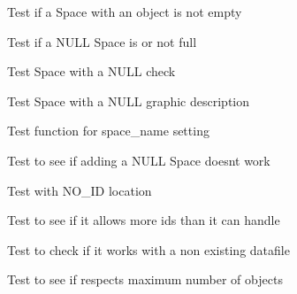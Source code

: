 \begin{DoxyRefList}
\item[\label{test__test000249}%
\hypertarget{test__test000249}{}%
Member \hyperlink{space__test_8h_aab8036bf4d58b361f8ac494ab94f6480}{test3\+\_\+space\+\_\+is\+\_\+empty} ()]Test if a Space with an object is not empty  
\item[\label{test__test000252}%
\hypertarget{test__test000252}{}%
Member \hyperlink{space__test_8h_a006533758c4f6d2d9cec39d52e70f561}{test3\+\_\+space\+\_\+is\+\_\+full} ()]Test if a N\+U\+LL Space is or not full  
\item[\label{test__test000222}%
\hypertarget{test__test000222}{}%
Member \hyperlink{space__test_8h_a71a928d80af21412a72e670f9505f2bf}{test3\+\_\+space\+\_\+set\+\_\+check} ()]Test Space with a N\+U\+LL check  
\item[\label{test__test000219}%
\hypertarget{test__test000219}{}%
Member \hyperlink{space__test_8h_a29d200c30a42700786a19f453f5a6b26}{test3\+\_\+space\+\_\+set\+\_\+graphic\+\_\+description} ()]Test Space with a N\+U\+LL graphic description  
\item[\label{test__test000208}%
\hypertarget{test__test000208}{}%
Member \hyperlink{space__test_8h_aa24a337830006e33706ab6ac1c416b47}{test3\+\_\+space\+\_\+set\+\_\+name} ()]Test function for space\+\_\+name setting  
\item[\label{test__test000050}%
\hypertarget{test__test000050}{}%
Member \hyperlink{game__test_8h_a5384fe9237e9434f5d1e80fc00380721}{test4\+\_\+game\+\_\+add\+\_\+object} ()]Test to see if adding a N\+U\+LL Space doesn\textquotesingle{}t work  
\item[\label{test__test000045}%
\hypertarget{test__test000045}{}%
Member \hyperlink{game__test_8h_a5f21b1b7e92b85990d3e5f4ea82ba68e}{test4\+\_\+game\+\_\+add\+\_\+player} ()]Test with N\+O\+\_\+\+ID location  
\item[\label{test__test000041}%
\hypertarget{test__test000041}{}%
Member \hyperlink{game__test_8h_a1cd2a0a0c093a5144ed375760b7dc10f}{test4\+\_\+game\+\_\+add\+\_\+space} ()]Test to see if it allows more ids than it can handle  
\item[\label{test__test000031}%
\hypertarget{test__test000031}{}%
Member \hyperlink{game__test_8h_aa6087c9d179d02f0fb7a5f1d0a13cffe}{test4\+\_\+game\+\_\+create\+\_\+from\+\_\+file} ()]Test to check if it works with a non existing datafile  
\item[\label{test__test000064}%
\hypertarget{test__test000064}{}%
Member \hyperlink{game__test_8h_a4186bf1b76d8e7ed80fb05b0947f9a1e}{test4\+\_\+game\+\_\+get\+\_\+objects\+\_\+number} ()]Test to see if respects maximum number of objects  

\end{DoxyRefList}

